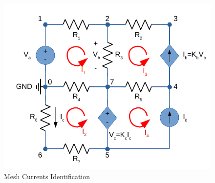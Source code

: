 \begin{figure}[H] \centering
  \includegraphics[width=0.7\linewidth]{MeshMethod.pdf}
  \caption{Mesh Currents Identification}
  \label{fig:MeshMethod}
\end{figure}

